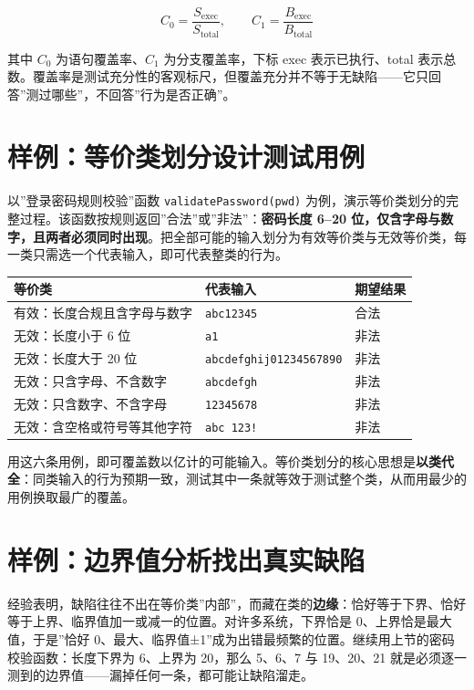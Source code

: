 \documentclass[12pt,a4paper,twoside,openany]{ctexbook}
\numberwithin{figure}{chapter}
\numberwithin{table}{chapter}
\newcounter{none}
\begin{document}
\[C_0=\frac{S_{\mathrm{exec}}}{S_{\mathrm{total}}},\qquad C_1=\frac{B_{\mathrm{exec}}}{B_{\mathrm{total}}}\]

其中 \(C_0\) 为语句覆盖率、\(C_1\) 为分支覆盖率，下标 exec
表示已执行、total
表示总数。覆盖率是测试充分性的客观标尺，但覆盖充分并不等于无缺陷------它只回答''测过哪些''，不回答''行为是否正确''。

\section{样例：等价类划分设计测试用例}\label{ux6837ux4f8bux7b49ux4ef7ux7c7bux5212ux5206ux8bbeux8ba1ux6d4bux8bd5ux7528ux4f8b}

以''登录密码规则校验''函数 \texttt{validatePassword(pwd)}
为例，演示等价类划分的完整过程。该函数按规则返回''合法''或''非法''：\textbf{密码长度
6--20
位，仅含字母与数字，且两者必须同时出现}。把全部可能的输入划分为有效等价类与无效等价类，每一类只需选一个代表输入，即可代表整类的行为。

{\def\LTcaptype{none} %
\begin{longtable}[]{@{}lll@{}}
\toprule\noalign{}
等价类 & 代表输入 & 期望结果 \\
\midrule\noalign{}
\endhead
\bottomrule\noalign{}
\endlastfoot
有效：长度合规且含字母与数字 & \texttt{abc12345} & 合法 \\
无效：长度小于 6 位 & \texttt{a1} & 非法 \\
无效：长度大于 20 位 & \texttt{abcdefghij01234567890} & 非法 \\
无效：只含字母、不含数字 & \texttt{abcdefgh} & 非法 \\
无效：只含数字、不含字母 & \texttt{12345678} & 非法 \\
无效：含空格或符号等其他字符 & \texttt{abc\ 123!} & 非法 \\
\end{longtable}
}

用这六条用例，即可覆盖数以亿计的可能输入。等价类划分的核心思想是\textbf{以类代全}：同类输入的行为预期一致，测试其中一条就等效于测试整个类，从而用最少的用例换取最广的覆盖。

\section{样例：边界值分析找出真实缺陷}\label{ux6837ux4f8bux8fb9ux754cux503cux5206ux6790ux627eux51faux771fux5b9eux7f3aux9677}

经验表明，缺陷往往不出在等价类''内部''，而藏在类的\textbf{边缘}：恰好等于下界、恰好等于上界、临界值加一或减一的位置。对许多系统，下界恰是
0、上界恰是最大值，于是''恰好
0、最大、临界值±1''成为出错最频繁的位置。继续用上节的密码校验函数：长度下界为
6、上界为 20，那么 5、6、7 与 19、20、21
就是必须逐一测到的边界值------漏掉任何一条，都可能让缺陷溜走。
\end{document}
